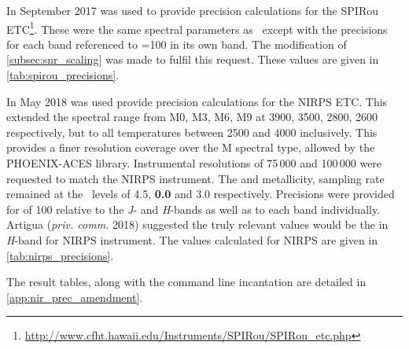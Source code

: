 In September 2017 \eniric{} was used to provide precision calculations for the {SPIRou} ETC\footnote{\url{http://www.cfht.hawaii.edu/Instruments/SPIRou/SPIRou_etc.php}}.
These were the same spectral parameters as~\citet{figueira_radial_2016} except with the precisions for each band referenced to {\snr{}=100} in its own band.
The modification of \cref{subsec:snr_scaling} was made to fulfil this request. These values are given in \cref{tab:spirou_precisions}.

In May 2018 \eniric{} was used provide precision calculations for the {NIRPS} {ETC}.
This extended the spectral range from {M0}, {M3}, {M6}, {M9} at 3900, 3500, 2800, 2600\K{} respectively, but to all temperatures between 2500\K{} and 4000\K{} inclusively.
This provides a finer resolution coverage over the M spectral type, allowed by the {PHOENIX-ACES} library.
Instrumental resolutions of 75\,000 and 100\,000 were requested to match the {NIRPS} instrument.
The \Logg{} and metallicity, sampling rate remained at the~\citet{figueira_radial_2016} levels of 4.5, \textbf{0.0} and 3.0 respectively.
Precisions were provided for \snr{} of 100 relative to the \emph{J}- and \emph{H}-bands as well as to each band individually.
Artigua (\emph{priv. comm.} 2018) suggested the truly relevant values would be the \snr{} in \emph{H}-band for {NIRPS} instrument.
The values calculated for {NIRPS} are given in \cref{tab:nirps_precisions}.

The result tables, along with the command line incantation are detailed in \cref{app:nir_prec_amendment}.




